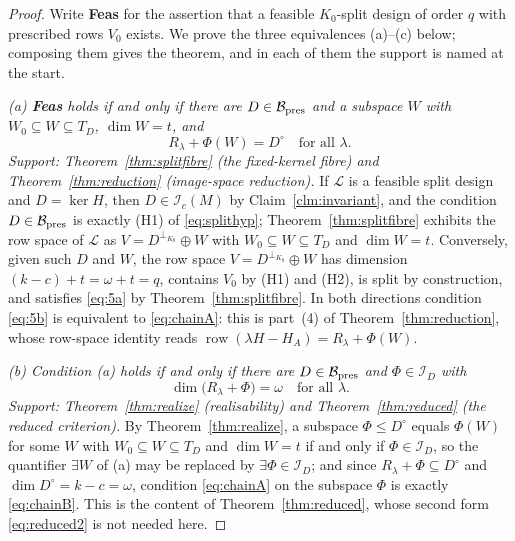 \documentclass[journal]{IEEEtran}
\theoremstyle{plainn}
\theoremstyle{remark}
\newcommand{\row}{\operatorname{row}}
\begin{document}
\begin{proof}
Write \textbf{Feas} for the assertion that a feasible $K_0$-split design of order $q$ with prescribed rows
$V_0$ exists. We prove the three equivalences (a)--(c) below; composing them gives the theorem, and in each
of them the support is named at the start.

\emph{(a) \textbf{Feas} holds if and only if there are $D\in\mathcal B_{\rm pres}$ and a subspace $W$ with
$W_0\subseteq W\subseteq T_D$, $\dim W=t$, and}
\begin{equation}\label{eq:chainA}
R_\lambda+\Phi(W)=D^\circ\quad\text{for all }\lambda .
\end{equation}
\emph{Support: Theorem~\ref{thm:splitfibre} (the fixed-kernel fibre) and Theorem~\ref{thm:reduction}
(image-space reduction).} If $\mathcal L$ is a feasible split design and $D=\ker H$, then $D\in\mathcal I_c(M)$
by Claim~\ref{clm:invariant}, and the condition $D\in\mathcal B_{\rm pres}$ is exactly (H1) of
\eqref{eq:splithyp}; Theorem~\ref{thm:splitfibre} exhibits the row space of $\mathcal L$ as
$V=D^{\perp_{K_0}}\oplus W$ with $W_0\subseteq W\subseteq T_D$ and $\dim W=t$. Conversely, given such $D$ and
$W$, the row space $V=D^{\perp_{K_0}}\oplus W$ has dimension $(k-c)+t=\omega+t=q$, contains $V_0$ by (H1)
and (H2), is split by construction, and satisfies \eqref{eq:5a} by Theorem~\ref{thm:splitfibre}. In both
directions condition \eqref{eq:5b} is equivalent to \eqref{eq:chainA}: this is part~(4) of
Theorem~\ref{thm:reduction}, whose row-space identity reads
$\row(\lambda H-H_A)=R_\lambda+\Phi(W)$.

\emph{(b) Condition (a) holds if and only if there are $D\in\mathcal B_{\rm pres}$ and $\Phi\in\mathcal I_D$
with}
\begin{equation}\label{eq:chainB}
\dim\bigl(R_\lambda+\Phi\bigr)=\omega\quad\text{for all }\lambda .
\end{equation}
\emph{Support: Theorem~\ref{thm:realize} (realisability) and Theorem~\ref{thm:reduced} (the reduced
criterion).} By Theorem~\ref{thm:realize}, a subspace $\Phi\le D^\circ$ equals $\Phi(W)$ for some $W$ with
$W_0\subseteq W\subseteq T_D$ and $\dim W=t$ if and only if $\Phi\in\mathcal I_D$, so the quantifier
$\exists W$ of (a) may be replaced by $\exists\Phi\in\mathcal I_D$; and since
$R_\lambda+\Phi\subseteq D^\circ$ and $\dim D^\circ=k-c=\omega$, condition \eqref{eq:chainA} on the
subspace $\Phi$ is exactly \eqref{eq:chainB}. This is the content of Theorem~\ref{thm:reduced}, whose second
form \eqref{eq:reduced2} is not needed here.


\end{proof}
\end{document}
